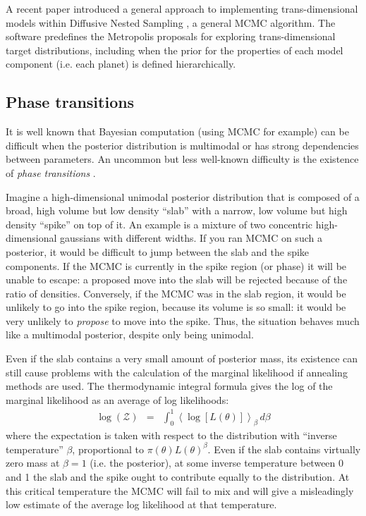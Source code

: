 \documentclass[useAMS,usenatbib]{mn2e}
\begin{document}
A recent paper \citep{rjobject} introduced a general approach to implementing
trans-dimensional models within Diffusive Nested Sampling \citep{dnest}, a
general MCMC algorithm. The \citet{rjobject} software predefines the
Metropolis proposals for exploring trans-dimensional target distributions,
including when the prior for the properties of each model component (i.e. each
planet) is defined hierarchically.

\subsection{Phase transitions}
It is well known that Bayesian computation (using MCMC for example) can be
difficult when the posterior distribution is multimodal or has strong
dependencies between parameters. An uncommon but less well-known difficulty
is the existence of {\it phase transitions} \citep{skilling}.

Imagine a high-dimensional unimodal posterior distribution that is composed of a
broad, high volume but low density ``slab'' with a narrow, low volume but high
density ``spike'' on top of it.
An example is a mixture of two concentric high-dimensional gaussians with
different widths. If you ran MCMC on such a posterior, it would be difficult
to jump between the slab and the spike components. If the MCMC is currently
in the spike region (or phase) it will be unable to escape: a proposed move
into the slab will be rejected because of the ratio of densities. Conversely,
if the MCMC was in the slab region, it would be unlikely to go into the spike
region, because its volume is so small: it would be very unlikely to
{\it propose} to move into the spike. Thus, the situation behaves much like
a multimodal posterior, despite only being unimodal.

Even if the slab contains a very small amount of posterior mass, its existence
can still cause problems with the calculation of the marginal likelihood
if annealing methods are used. The thermodynamic integral formula gives
the log of the marginal likelihood as an average of log likelihoods:
\begin{eqnarray}
\log(\mathcal{Z}) &=& \int_0^1 \left<\log\left[L(\theta)\right]\right>_\beta \, d\beta
\end{eqnarray}
where the expectation is taken with respect to the
distribution with ``inverse temperature'' $\beta$, proportional to
$\pi(\theta)L(\theta)^\beta$. Even if the slab contains virtually zero mass
at $\beta=1$ (i.e. the posterior), at some inverse temperature between 0 and 1
the slab and the spike ought to contribute equally to the distribution. At
this critical temperature the MCMC will fail to mix and will give a misleadingly
low estimate of the average log likelihood at that temperature.
\end{document}

